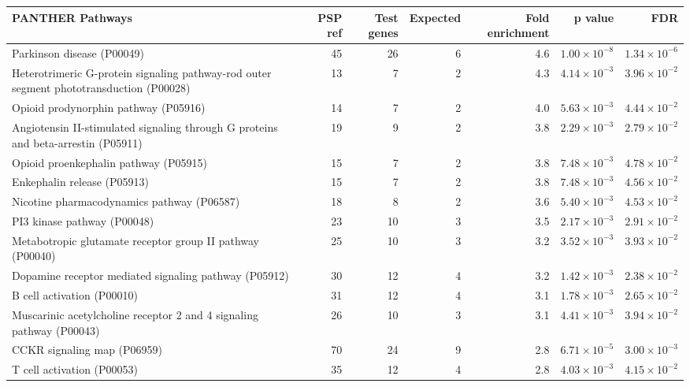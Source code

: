 \begin{table}[ht]
\centering
\begin{adjustbox}{width=\textwidth}

\begin{tabular}{lrrrrrr}
  \hline
PANTHER Pathways & PSP ref & Test genes & Expected & Fold enrichment & p value & FDR \\ 
  \hline
Parkinson disease (P00049) & 45 & 26 & 6 & 4.6 & $1.00 \times 10^{-8}$ & $1.34 \times 10^{-6}$ \\ 
  Heterotrimeric G-protein signaling pathway-rod outer segment phototransduction (P00028) & 13 & 7 & 2 & 4.3 & $4.14 \times 10^{-3}$ & $3.96 \times 10^{-2}$ \\ 
  Opioid prodynorphin pathway (P05916) & 14 & 7 & 2 & 4.0 & $5.63 \times 10^{-3}$ & $4.44 \times 10^{-2}$ \\ 
  Angiotensin II-stimulated signaling through G proteins and beta-arrestin (P05911) & 19 & 9 & 2 & 3.8 & $2.29 \times 10^{-3}$ & $2.79 \times 10^{-2}$ \\ 
  Opioid proenkephalin pathway (P05915) & 15 & 7 & 2 & 3.8 & $7.48 \times 10^{-3}$ & $4.78 \times 10^{-2}$ \\ 
  Enkephalin release (P05913) & 15 & 7 & 2 & 3.8 & $7.48 \times 10^{-3}$ & $4.56 \times 10^{-2}$ \\ 
  Nicotine pharmacodynamics pathway (P06587) & 18 & 8 & 2 & 3.6 & $5.40 \times 10^{-3}$ & $4.53 \times 10^{-2}$ \\ 
  PI3 kinase pathway (P00048) & 23 & 10 & 3 & 3.5 & $2.17 \times 10^{-3}$ & $2.91 \times 10^{-2}$ \\ 
  Metabotropic glutamate receptor group II pathway (P00040) & 25 & 10 & 3 & 3.2 & $3.52 \times 10^{-3}$ & $3.93 \times 10^{-2}$ \\ 
  Dopamine receptor mediated signaling pathway (P05912) & 30 & 12 & 4 & 3.2 & $1.42 \times 10^{-3}$ & $2.38 \times 10^{-2}$ \\ 
  B cell activation (P00010) & 31 & 12 & 4 & 3.1 & $1.78 \times 10^{-3}$ & $2.65 \times 10^{-2}$ \\ 
  Muscarinic acetylcholine receptor 2 and 4 signaling pathway (P00043) & 26 & 10 & 3 & 3.1 & $4.41 \times 10^{-3}$ & $3.94 \times 10^{-2}$ \\ 
  CCKR signaling map (P06959) & 70 & 24 & 9 & 2.8 & $6.71 \times 10^{-5}$ & $3.00 \times 10^{-3}$ \\ 
  T cell activation (P00053) & 35 & 12 & 4 & 2.8 & $4.03 \times 10^{-3}$ & $4.15 \times 10^{-2}$ \\ 

\end{tabular}
\end{adjustbox}
\end{table}
